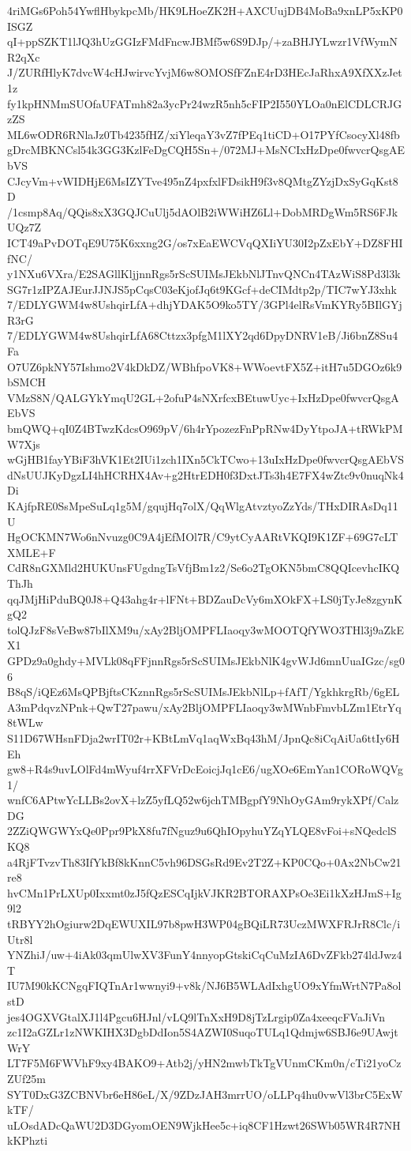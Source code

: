 4riMGs6Poh54YwflHbykpcMb/HK9LHoeZK2H+AXCUujDB4MoBa9xnLP5xKP0ISGZ
qI+ppSZKT1lJQ3hUzGGIzFMdFncwJBMf5w6S9DJp/+zaBHJYLwzr1VfWymNR2qXc
J/ZURfHlyK7dvcW4cHJwirvcYvjM6w8OMOSfFZnE4rD3HEcJaRhxA9XfXXzJet1z
fy1kpHNMmSUOfaUFATmh82a3ycPr24wzR5nh5cFIP2I550YLOa0nElCDLCRJGzZS
ML6wODR6RNlaJz0Tb4235fHZ/xiYleqaY3vZ7fPEq1tiCD+O17PYfCsocyXl48fb
gDrcMBKNCsl54k3GG3KzlFeDgCQH5Sn+/072MJ+MsNCIxHzDpe0fwvcrQsgAEbVS
CJcyVm+vWIDHjE6MsIZYTve495nZ4pxfxlFDsikH9f3v8QMtgZYzjDxSyGqKst8D
/1csmp8Aq/QQis8xX3GQJCuUlj5dAOlB2iWWiHZ6Ll+DobMRDgWm5RS6FJkUQz7Z
ICT49aPvDOTqE9U75K6xxng2G/os7xEaEWCVqQXIiYU30I2pZxEbY+DZ8FHIfNC/
y1NXu6VXra/E2SAGllKljjnnRgs5rScSUIMsJEkbNlJTnvQNCn4TAzWiS8Pd3l3k
SG7r1zIPZAJEurJJNJS5pCqsC03eKjofJq6t9KGcf+deCIMdtp2p/TIC7wYJ3xhk
7/EDLYGWM4w8UshqirLfA+dhjYDAK5O9ko5TY/3GPl4elRsVmKYRy5BIlGYjR3rG
7/EDLYGWM4w8UshqirLfA68Cttzx3pfgM1lXY2qd6DpyDNRV1eB/Ji6bnZ8Su4Fa
O7UZ6pkNY57Ishmo2V4kDkDZ/WBhfpoVK8+WWoevtFX5Z+itH7u5DGOz6k9bSMCH
VMzS8N/QALGYkYmqU2GL+2ofuP4sNXrfcxBEtuwUyc+IxHzDpe0fwvcrQsgAEbVS
bmQWQ+qI0Z4BTwzKdcsO969pV/6h4rYpozezFnPpRNw4DyYtpoJA+tRWkPMW7Xjs
wGjHB1fayYBiF3hVK1Et2IUi1zch1IXn5CkTCwo+13uIxHzDpe0fwvcrQsgAEbVS
dNsUUJKyDgzLI4hHCRHX4Av+g2HtrEDH0f3DxtJTs3h4E7FX4wZtc9v0nuqNk4Di
KAjfpRE0SsMpeSuLq1g5M/gqujHq7olX/QqWlgAtvztyoZzYds/THxDIRAsDq11U
HgOCKMN7Wo6nNvuzg0C9A4jEfMOl7R/C9ytCyAARtVKQI9K1ZF+69G7cLTXMLE+F
CdR8nGXMld2HUKUnsFUgdngTsVfjBm1z2/Se6o2TgOKN5bmC8QQIcevhcIKQThJh
qqJMjHiPduBQ0J8+Q43ahg4r+lFNt+BDZauDcVy6mXOkFX+LS0jTyJe8zgynKgQ2
tolQJzF8sVeBw87bIlXM9u/xAy2BljOMPFLIaoqy3wMOOTQfYWO3THl3j9aZkEX1
GPDz9a0ghdy+MVLk08qFFjnnRgs5rScSUIMsJEkbNlK4gvWJd6mnUuaIGzc/sg06
B8qS/iQEz6MsQPBjftsCKznnRgs5rScSUIMsJEkbNlLp+fAfT/YgkhkrgRb/6gEL
A3mPdqvzNPnk+QwT27pawu/xAy2BljOMPFLIaoqy3wMWnbFmvbLZm1EtrYq8tWLw
S11D67WHsnFDja2wrIT02r+KBtLmVq1aqWxBq43hM/JpnQc8iCqAiUa6ttIy6HEh
gw8+R4s9uvLOlFd4mWyuf4rrXFVrDcEoicjJq1cE6/ugXOe6EmYan1CORoWQVg1/
wnfC6APtwYcLLBs2ovX+lzZ5yfLQ52w6jchTMBgpfY9NhOyGAm9rykXPf/CalzDG
2ZZiQWGWYxQe0Ppr9PkX8fu7fNguz9u6QhIOpyhuYZqYLQE8vFoi+sNQedclSKQ8
a4RjFTvzvTh83IfYkBf8kKnnC5vh96DSGsRd9Ev2T2Z+KP0CQo+0Ax2NbCw21re8
hvCMn1PrLXUp0Ixxmt0zJ5fQzESCqIjkVJKR2BTORAXPsOe3Ei1kXzHJmS+Ig9l2
tRBYY2hOgiurw2DqEWUXIL97b8pwH3WP04gBQiLR73UczMWXFRJrR8Clc/iUtr8l
YNZhiJ/uw+4iAk03qmUlwXV3FunY4nnyopGtskiCqCuMzIA6DvZFkb274ldJwz4T
IU7M90kKCNgqFIQTnAr1wwnyi9+v8k/NJ6B5WLAdIxhgUO9xYfmWrtN7Pa8olstD
jes4OGXVGtalXJ1l4Pgcu6HJnl/vLQ9lTnXxH9D8jTzLrgip0Za4xeeqcFVaJiVn
zc1I2aGZLr1zNWKIHX3DgbDdIon5S4AZWI0SuqoTULq1Qdmjw6SBJ6e9UAwjtWrY
LT7F5M6FWVhF9xy4BAKO9+Atb2j/yHN2mwbTkTgVUnmCKm0n/cTi21yoCzZUf25m
SYT0DxG3ZCBNVbr6eH86eL/X/9ZDzJAH3mrrUO/oLLPq4hu0vwVl3brC5ExWkTF/
uLOsdADcQaWU2D3DGyomOEN9WjkHee5c+iq8CF1Hzwt26SWb05WR4R7NHkKPhzti
